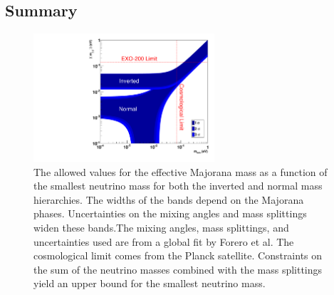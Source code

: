 \documentclass[herrin-thesis.tex]{subfiles}
\begin{document}
\subsection{Summary}

\begin{figure}[htb]
	\centering
	\includegraphics[width=0.6\textwidth]{./plots/nu_meff_v_mmin.pdf}
	\caption[Effective Majorana mass vs. smallest neutrino mass]{The allowed values for the effective Majorana mass as a function of the smallest neutrino mass for both the inverted and normal mass hierarchies. The widths of the bands depend on the Majorana phases. Uncertainties on the mixing angles and mass splittings widen these bands.The mixing angles, mass splittings, and uncertainties used are from a global fit by Forero et al.\cite{Forero:2012cr} The cosmological limit comes from the Planck satellite. Constraints on the sum of the neutrino masses combined with the mass splittings yield an upper bound for the smallest neutrino mass.}
	\label{fig:nu_meff_v_mmin}
\end{figure}\addref
\end{document}

